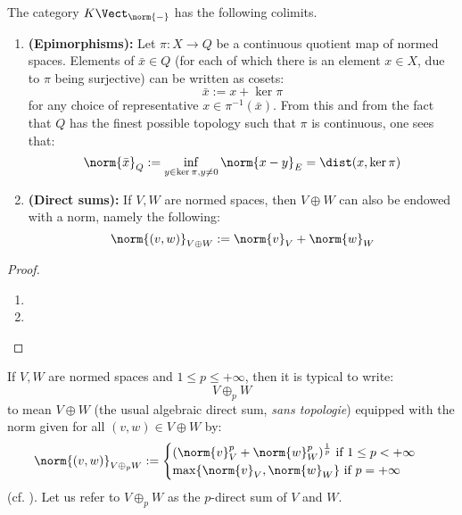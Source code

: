         \begin{lemma} \label{lemma: colimits_of_normed_spaces}
            The category $K\-\Vect_{\norm{-}}$ has the following colimits.
            \begin{enumerate}
                \item \textbf{(Epimorphisms):} Let $\pi: X \to Q$ be a continuous quotient map of normed spaces. Elements of $\bar{x} \in Q$ (for each of which there is an element $x \in X$, due to $\pi$ being surjective) can be written as cosets:
                    $$\bar{x} := x + \ker \pi$$
                for any choice of representative $x \in \pi^{-1}(\bar{x})$. From this and from the fact that $Q$ has the finest possible topology such that $\pi$ is continuous, one sees that:
                    $$\norm{\bar{x}}_Q := \inf_{y \in \ker \pi, y \not = 0} \norm{x - y}_E = \dist(x, \ker \pi)$$
                \item \textbf{(Direct sums):} If $V, W$ are normed spaces, then $V \oplus W$ can also be endowed with a norm, namely the following:
                    $$\norm{(v, w)}_{V \oplus W} := \norm{v}_V + \norm{w}_W$$
            \end{enumerate}
        \end{lemma}
            \begin{proof}
                \begin{enumerate}
                    \item 
                    \item 
                \end{enumerate}
            \end{proof}


        \begin{convention}
            If $V, W$ are normed spaces and $1 \leq p \leq +\infty$, then it is typical to write:
                $$V \oplus_p W$$
            to mean $V \oplus W$ (the usual algebraic direct sum, \textit{sans topologie}) equipped with the norm given for all $(v, w) \in V \oplus W$ by:
                $$
                    \norm{(v, w)}_{V \oplus_p W} :=
                    \begin{cases}
                        \text{$(\norm{v}_V^p + \norm{w}_W^p)^{\frac1p}$ if $1 \leq p < +\infty$}
                        \\
                        \text{$\max\{ \norm{v}_V, \norm{w}_W \}$ if $p = +\infty$}
                    \end{cases}
                $$
            (cf. \cite[Example, p. 24]{litvak_functional_analysis_notes}). Let us refer to $V \oplus_p W$ as the $p$-direct sum of $V$ and $W$.
        \end{convention}

